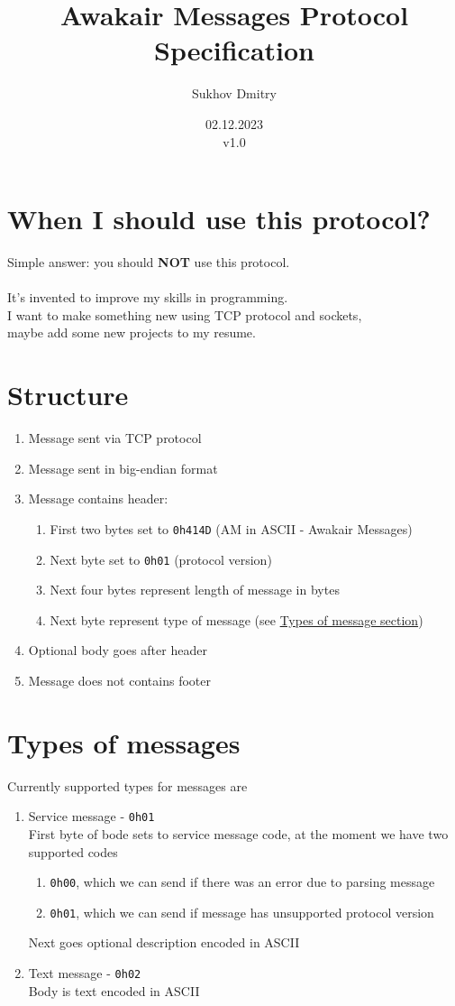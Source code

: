 \documentclass[12pt]{article}
\title{Awakair Messages Protocol Specification}
\author{Sukhov Dmitry}
\date{02.12.2023 \\ v1.0}
\begin{document}
\maketitle
\thispagestyle{empty}
\newpage
\tableofcontents
\thispagestyle{empty}
\newpage
\section{When I should use this protocol?}
{\large{Simple answer: you should \textbf{NOT} use this protocol.}} \\ \\
It's invented to improve my skills in programming. \\
I want to make something new using TCP protocol and sockets, \\ maybe add some new projects to my resume.
\newpage
\section{Structure}
\begin{enumerate}
\item Message sent via TCP protocol
\item Message sent in big-endian format
\item Message contains header:
\begin{enumerate}
\item First two bytes set to \texttt{0h414D} (AM in ASCII - Awakair Messages)
\item Next byte set to \texttt{0h01} (protocol version)
\item Next four bytes represent length of message in bytes
\item Next byte represent type of message (see \hyperref[sec:types]{Types of message section})
\end{enumerate}
\item Optional body goes after header
\item Message does not contains footer
\end{enumerate}
\newpage
\section{Types of messages}
Currently supported types for messages are
\begin{enumerate}
\item Service message - \texttt{0h01} \\
First byte of bode sets to service message code, at the moment we have two supported codes
\begin{enumerate}
\item \texttt{0h00}, which we can send if there was an error due to parsing message
\item \texttt{0h01}, which we can send if message has unsupported protocol version
\end{enumerate}
 Next goes optional description encoded in ASCII
\item Text message - \texttt{0h02} \\
Body is text encoded in ASCII
\end{enumerate}
\label{sec:types}
\newpage
\end{document}
